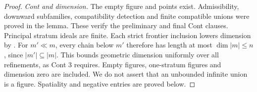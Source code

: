 \begin{proof}
\emph{Cont and dimension.}
The empty figure and points exist.
Admissibility, downward subfamilies,
compatibility detection and finite
compatible unions were proved in
the lemma. These verify the
preliminary and final Cont clauses.
Principal stratum ideals are finite.
Each strict frontier inclusion
lowers dimension by
\citet[Theorem 3.22]{Coste1999}.
For \(m'\ll m\), every chain
below \(m'\) therefore has length
at most \(\dim|m|\leq n\), since
\(|m'|\subseteq|m|\). This bounds
geometric dimension uniformly over
all refinements, as Cont 3 requires.
Empty figures, one-stratum figures
and dimension zero are included.
We do not assert that an unbounded
infinite union is a figure.
Spatiality and negative entries
are proved below.
\end{proof}
